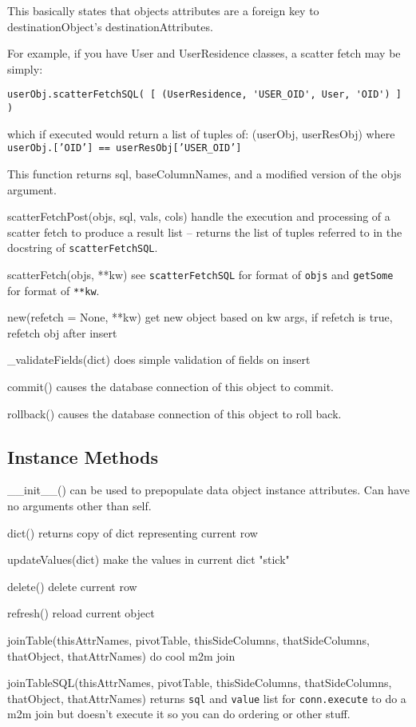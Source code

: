 \documentclass[titlepage]{manual}
\begin{document}
\begin{argdesc}
        This basically states that objects attributes are a foreign key to
        destinationObject's destinationAttributes.

        For example, if you have User and UserResidence classes, a scatter
        fetch may be simply:
\begin{verbatim}
userObj.scatterFetchSQL( [ (UserResidence, 'USER_OID', User, 'OID') ] )
\end{verbatim}
        which if executed would return a list of tuples of:
            (userObj, userResObj)
        where \texttt{userObj.['OID'] == userResObj['USER_OID']}

        This function returns sql, baseColumnNames, and a modified version of
        the objs argument.
\item[scatterFetchPost(objs, sql, vals, cols)] handle the execution
and processing of a scatter fetch to produce a result list -- returns
the list of tuples referred to in the docstring of \texttt{scatterFetchSQL}.
\item[scatterFetch(objs, **kw)] see \texttt{scatterFetchSQL} for
format of \texttt{objs} and \texttt{getSome} for format of
\texttt{**kw}.

\item[new(refetch = None, **kw)] get new object based on kw args, if
refetch is true, refetch obj after insert
\item[_validateFields(dict)] does simple validation of fields on
insert
\item[commit()] causes the database connection of this object to
commit.
\item[rollback()]  causes the database connection of this object to
roll back.
\end{argdesc}

\subsection{Instance Methods}
\begin{argdesc}
\item[__init__()] can be used to prepopulate data object instance attributes.  Can have no arguments other than self.
\item[dict()] returns copy of dict representing current row
\item[updateValues(dict)] make the values in current dict "stick"
\item[delete()] delete current row
\item[refresh()] reload current object
\item[joinTable(thisAttrNames, pivotTable, thisSideColumns,
thatSideColumns, thatObject, thatAttrNames)] do cool m2m join
\item[joinTableSQL(thisAttrNames, pivotTable, thisSideColumns,
thatSideColumns, thatObject, thatAttrNames)] returns \texttt{sql} and
\texttt{value} list for \texttt{conn.execute} to do a m2m join but
doesn't execute it so you can do ordering or other stuff.
\end{argdesc}
\end{document}
